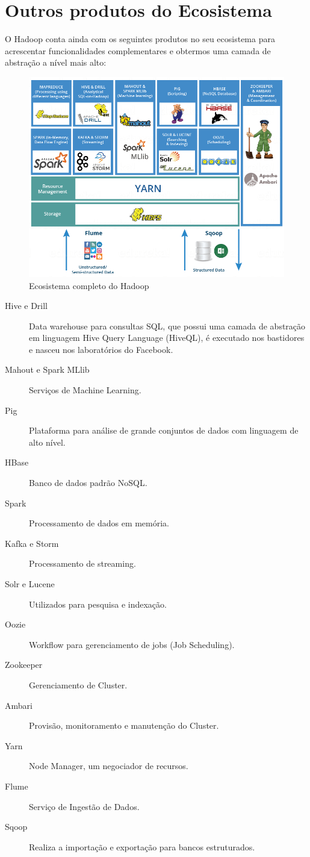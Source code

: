 \documentclass[a4paper,11pt]{article}
\begin{document}
\section{Outros produtos do Ecosistema}
O Hadoop conta ainda com os seguintes produtos no seu ecosistema para acrescentar funcionalidades complementares e obtermos uma camada de abstração a nível mais alto:
\begin{figure}[!htb]
	\centering
	\includegraphics[width=1.0\textwidth]{imgHadoop/ecosistema.png}
	\caption{Ecosistema completo do Hadoop}
\end{figure}
\begin{description}
	\item[Hive e Drill] Data warehouse para consultas SQL, que possui uma camada de abstração em linguagem Hive Query Language (HiveQL), é executado nos bastidores e nasceu nos laboratórios do Facebook.
	\item[Mahout e Spark MLlib] Serviços de Machine Learning.
	\item[Pig] Plataforma para análise de grande conjuntos de dados com linguagem de alto nível.
	\item[HBase] Banco de dados padrão NoSQL.
	\item[Spark] Processamento de dados em memória.
	\item[Kafka e Storm] Processamento de streaming.
	\item[Solr e Lucene] Utilizados para pesquisa e indexação.
	\item[Oozie] Workflow para gerenciamento de jobs (Job Scheduling).
	\item[Zookeeper] Gerenciamento de Cluster.
	\item[Ambari] Provisão, monitoramento e manutenção do Cluster.
	\item[Yarn] Node Manager, um negociador de recursos.
	\item[Flume] Serviço de Ingestão de Dados.
	\item[Sqoop] Realiza a importação e exportação para bancos estruturados.
\end{description}
\end{document}
